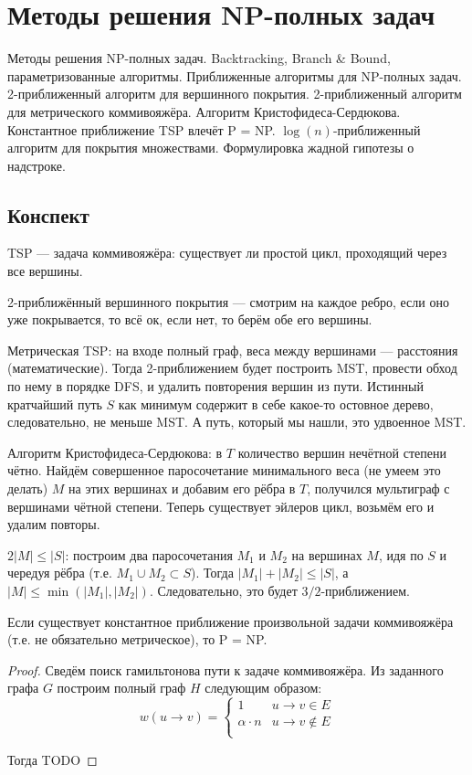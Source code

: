 \section{Методы решения NP-полных задач}
Методы решения NP-полных задач.
Backtracking, Branch \& Bound, параметризованные алгоритмы.
Приближенные алгоритмы для NP-полных задач.
2-приближенный алгоритм для вершинного покрытия.
2-приближенный алгоритм для метрического коммивояжёра.
Алгоритм Кристофидеса-Сердюкова.
Константное приближение TSP влечёт P = NP.
$\log(n)$-приближенный алгоритм для покрытия множествами.
Формулировка жадной гипотезы о надстроке.

\subsection{Конспект}
TSP --- задача коммивояжёра:
существует ли простой цикл,
проходящий через все вершины.

\bigskip

2-приближённый вершинного покрытия
--- смотрим на каждое ребро, если оно уже покрывается,
то всё ок, если нет, то берём обе его вершины.

\bigskip

Метрическая TSP: на входе полный граф,
веса между вершинами --- расстояния (математические).
Тогда 2-приближением будет построить MST,
провести обход по нему в порядке DFS,
и удалить повторения вершин из пути.
Истинный кратчайший путь $S$
как минимум содержит в себе какое-то
остовное дерево, следовательно,
не меньше MST.
А путь, который мы нашли, это удвоенное MST.

\bigskip

Алгоритм Кристофидеса-Сердюкова:
в $T$ количество вершин нечётной степени чётно.
Найдём совершенное паросочетание
минимального веса (не умеем это делать) $M$
на этих вершинах
и добавим его рёбра в $T$,
получился мультиграф с вершинами чётной степени.
Теперь существует эйлеров цикл,
возьмём его и удалим повторы.

$2 |M| \le |S|$:
построим два паросочетания $M_1$ и $M_2$ на вершинах $M$,
идя по $S$ и чередуя рёбра (т.е. $M_1 \cup M_2 \subset S$).
Тогда $|M_1| + |M_2| \le |S|$,
а $|M| \le \min(|M_1|, |M_2|)$.
Следовательно, это будет $3/2$-приближением.

\begin{theorem}
    Если существует константное приближение
    произвольной задачи коммивояжёра
    (т.е. не обязательно метрическое),
    то P = NP.
\end{theorem}
\begin{proof}
    Сведём поиск гамильтонова пути к задаче коммивояжёра.
    Из заданного графа $G$ построим полный граф $H$
    следующим образом:
    \[
        w(u \to v) =
        \begin{cases}
            1 & u \to v \in E \\
            \alpha \cdot n & u \to v \notin E \\
        \end{cases}
    \]

    Тогда
    TODO
\end{proof}

